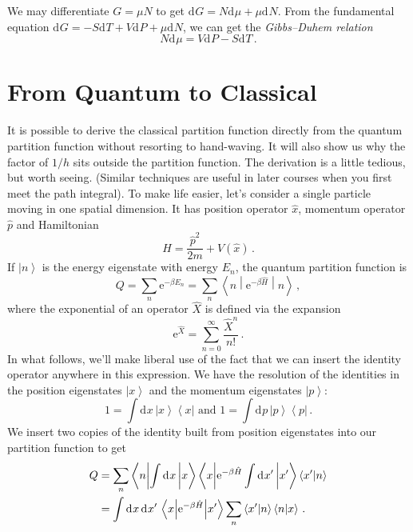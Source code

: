 \documentclass{article}
\theoremstyle{plain}\theoremheaderfont{\normalfont\bfseries}\theorembodyfont{\rmfamily}\theoremseparator{.}\newtheorem*{thm}{Theorem}\newtheorem*{law}{Law}\newtheorem*{pos}{Postulate}
\numberwithin{equation}{section}
\newcommand{\ee}{\mathrm{e}}
\newcommand{\dd}[2][]{\mathrm{d}^{#1} #2\,}
\renewcommand{\d}[2][]{\mathrm{d}^{#1} #2}
\newcommand{\bra}[1]{\left\langle #1 \right|}
\newcommand{\ket}[1]{\left| #1 \right\rangle}
\newcommand{\braket}[2]{\left\langle #1 \middle| #2 \right\rangle}
\newcommand{\mel}[3]{\left\langle #1 \middle| #2 \middle| #3 \right\rangle}
\newcommand{\expval}[2]{\left\langle #2 \middle| #1 \middle| #2 \right\rangle}
\begin{document}
    We may differentiate \(G=\mu N\) to get \(\d{G}=N\d{\mu}+\mu\d{N}\). From the fundamental equation \(\d{G}=-S\d{T}+V\d{P}+\mu\d{N}\), we can get the \textit{Gibbs--Duhem relation}
    \begin{equation}
        N\d{\mu}=V\d{P}-S\d{T}\,.
    \end{equation}

    \section{From Quantum to Classical}\label{Chap:Quantum_to_Classical}
    It is possible to derive the classical partition function directly from the quantum partition function without resorting to hand-waving. It will also show us why the factor of \(1/h\) sits outside the partition function. The derivation is a little tedious, but worth seeing. (Similar techniques are useful in later courses when you first meet the path integral). To make life easier, let's consider a single particle moving in one spatial dimension. It has position operator \(\hat{x}\), momentum operator \(\hat{p}\) and Hamiltonian
    \begin{equation}
        \hat{H}=\frac{\hat{p}^2}{2m}+V(\hat{x})\,.
    \end{equation}
    If \(\ket{n}\) is the energy eigenstate with energy \(E_n\), the quantum partition function is
    \begin{equation}
        Q=\sum_n \ee^{-\beta E_n}=\sum_n\expval{\ee^{-\beta\hat{H}}}{n}\,,
    \end{equation}
    where the exponential of an operator \(\hat{X}\) is defined via the expansion
    \begin{equation}
        \ee^{\hat{X}}=\sum_{n=0}^{\infty}\frac{\hat{X}^n}{n!}\,.
    \end{equation}
    In what follows, we'll make liberal use of the fact that we can insert the identity operator anywhere in this expression. We have the resolution of the identities in the position eigenstates \(\ket{x}\) and the momentum eigenstates \(\ket{p}\):
    \begin{equation}
        1=\int\dd{x}\ket{x}\bra{x} \text{ and } 1=\int\dd{p}\ket{p}\bra{p}\,.
    \end{equation}
    We insert two copies of the identity built from position eigenstates into our partition function to get
    \begin{align}
        Q&=\sum_n\mel{n}{\int\dd{x}}{x}\mel{x}{\ee^{-\beta\hat{H}}\int\dd{x'}}{x'}\braket{x'}{n}\notag \\
        &=\int\dd{x}\dd{x'}\mel{x}{\ee^{-\beta\hat{H}}}{x'}\sum_n\braket{x'}{n}\braket{n}{x}\,.
    \end{align}
\end{document}
